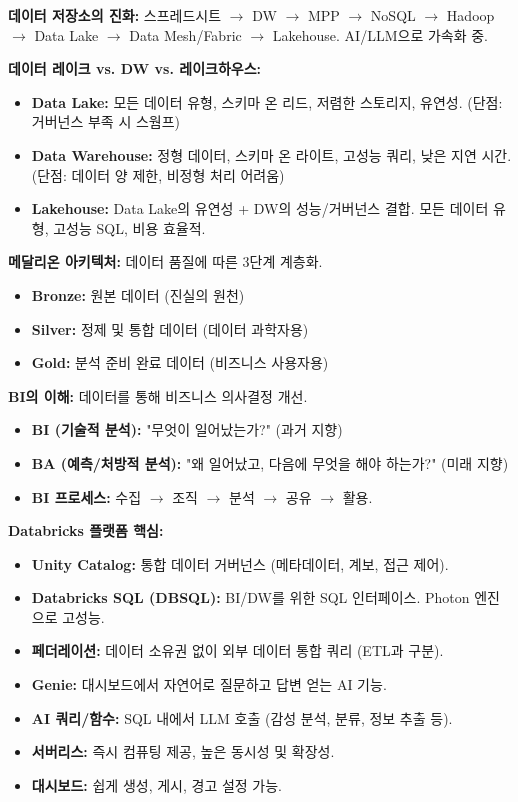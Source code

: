 \documentclass[11pt,a4paper]{article}
\begin{document}
\begin{tcolorbox}[mybox={CSCI103 Lecture 6 핵심 요약}]
\textbf{데이터 저장소의 진화:} 스프레드시트 $\rightarrow$ DW $\rightarrow$ MPP $\rightarrow$ NoSQL $\rightarrow$ Hadoop $\rightarrow$ Data Lake $\rightarrow$ Data Mesh/Fabric $\rightarrow$ Lakehouse. AI/LLM으로 가속화 중.

\textbf{데이터 레이크 vs. DW vs. 레이크하우스:}
\begin{itemize}
    \item \textbf{Data Lake:} 모든 데이터 유형, 스키마 온 리드, 저렴한 스토리지, 유연성. (단점: 거버넌스 부족 시 스웜프)
    \item \textbf{Data Warehouse:} 정형 데이터, 스키마 온 라이트, 고성능 쿼리, 낮은 지연 시간. (단점: 데이터 양 제한, 비정형 처리 어려움)
    \item \textbf{Lakehouse:} Data Lake의 유연성 + DW의 성능/거버넌스 결합. 모든 데이터 유형, 고성능 SQL, 비용 효율적.
\end{itemize}

\textbf{메달리온 아키텍처:} 데이터 품질에 따른 3단계 계층화.
\begin{itemize}
    \item \textbf{Bronze:} 원본 데이터 (진실의 원천)
    \item \textbf{Silver:} 정제 및 통합 데이터 (데이터 과학자용)
    \item \textbf{Gold:} 분석 준비 완료 데이터 (비즈니스 사용자용)
\end{itemize}

\textbf{BI의 이해:} 데이터를 통해 비즈니스 의사결정 개선.
\begin{itemize}
    \item \textbf{BI (기술적 분석):} "무엇이 일어났는가?" (과거 지향)
    \item \textbf{BA (예측/처방적 분석):} "왜 일어났고, 다음에 무엇을 해야 하는가?" (미래 지향)
    \item \textbf{BI 프로세스:} 수집 $\rightarrow$ 조직 $\rightarrow$ 분석 $\rightarrow$ 공유 $\rightarrow$ 활용.
\end{itemize}

\textbf{Databricks 플랫폼 핵심:}
\begin{itemize}
    \item \textbf{Unity Catalog:} 통합 데이터 거버넌스 (메타데이터, 계보, 접근 제어).
    \item \textbf{Databricks SQL (DBSQL):} BI/DW를 위한 SQL 인터페이스. Photon 엔진으로 고성능.
    \item \textbf{페더레이션:} 데이터 소유권 없이 외부 데이터 통합 쿼리 (ETL과 구분).
    \item \textbf{Genie:} 대시보드에서 자연어로 질문하고 답변 얻는 AI 기능.
    \item \textbf{AI 쿼리/함수:} SQL 내에서 LLM 호출 (감성 분석, 분류, 정보 추출 등).
    \item \textbf{서버리스:} 즉시 컴퓨팅 제공, 높은 동시성 및 확장성.
    \item \textbf{대시보드:} 쉽게 생성, 게시, 경고 설정 가능.
\end{itemize}


\end{tcolorbox}
\end{document}
